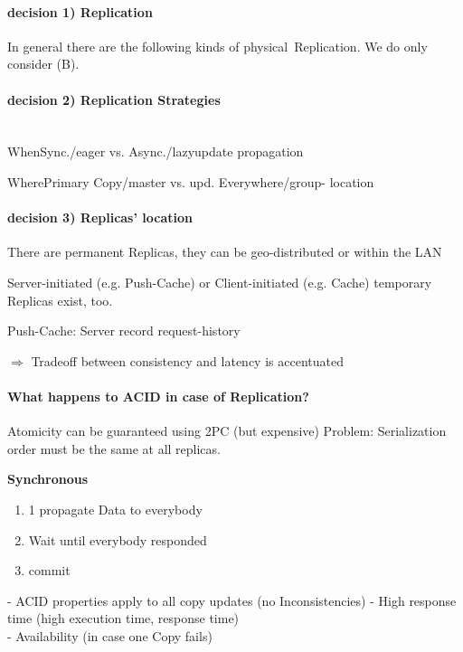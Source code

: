 \documentclass[a4paper,12pt]{article}%
\newif\ifcomment
\begin{document}
\paragraph{decision 1) Replication}
In general there are the following kinds of \glqq physical\grqq ~Replication. We do only consider (B).

\paragraph{decision 2) Replication Strategies}~\\
When\qquad Sync./eager vs. Async./lazy\qquad \qquad\qquad\qquad update propagation

Where\qquad Primary Copy/master vs. upd. Everywhere/group\qquad - location

\paragraph{decision 3) Replicas' location}
There are permanent Replicas, they can be geo-distributed or within the LAN

Server-initiated (e.g. Push-Cache) or Client-initiated (e.g. Cache) temporary Replicas exist, too.

Push-Cache: Server record request-history

$\Rightarrow$ Tradeoff between consistency and latency is accentuated

\paragraph{What happens to ACID in case of Replication?}
Atomicity can be guaranteed using 2PC (but expensive)
Problem: Serialization order must be the same at all replicas.



\ifcomment
{\bf Synchronous} 


\begin{enumerate}
 \item 1 propagate Data  to everybody
 \item Wait until everybody responded 
 \item commit        
\end{enumerate}

 {\color[HTML]{9AB299} 
- ACID properties apply to all copy updates (no Inconsistencies)}    
{\color[HTML]{A38C8C} -  High response time (high execution time, response time)\\
- Availability (in case one Copy fails)}
\end{document}
